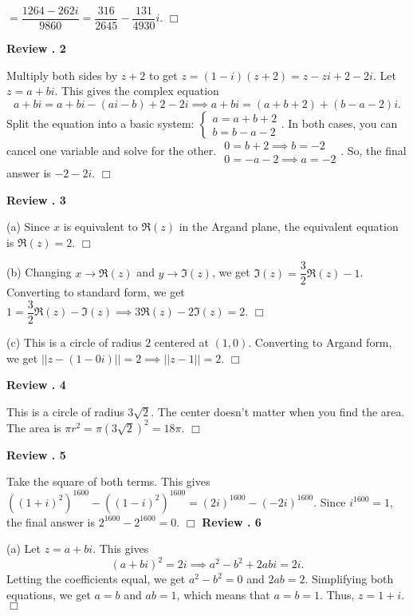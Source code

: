 \documentclass[lang=en,11pt]{elegantbook}
\begin{document}
\hspace{5mm} $\displaystyle =\dfrac{1264-262i}{9860}=\boxed{\dfrac{316}{2645}-\dfrac{131}{4930}i}.$ $\Box$\vspace{3mm}

\noindent \textbf{Review . 2}

Multiply both sides by $z+2$ to get $z=(1-i)(z+2)=z-zi+2-2i$.  Let $z=a+bi$.  This gives the complex equation $$a+bi=a+bi-(ai-b)+2-2i \implies a+bi=(a+b+2)+(b-a-2)i.$$  Split the equation into a basic system: $\begin{cases} a=a+b+2 \\ b=b-a-2 \end{cases}$.  In both cases, you can cancel one variable and solve for the other.  $\begin{matrix} 0=b+2 \implies b=-2 \\ 0=-a-2 \implies a=-2 \end{matrix}$.  So, the final answer is $\boxed{-2-2i}$. $\Box$\vspace{3mm}

\noindent \textbf{Review . 3}

(a) Since $x$ is equivalent to $\Re(z)$ in the Argand plane, the equivalent equation is $\boxed{\Re(z)=2}$. $\Box$

(b) Changing $x\to\Re(z)$ and $y\to\Im(z)$, we get $\Im(z)=\dfrac{3}{2}\Re(z)-1$.  Converting to standard form, we get $1=\dfrac{3}{2}\Re(z)-\Im(z) \implies \boxed{3\Re(z)-2\Im(z)=2}.$ $\Box$

(c) This is a circle of radius $2$ centered at $(1,0)$.  Converting to Argand form, we get $||z-(1-0i)||=2 \implies \boxed{||z-1||=2}.$ $\Box$\vspace{3mm}

\noindent \textbf{Review . 4}

This is a circle of radius $3\sqrt{2}$.  The center doesn't matter when you find the area.  The area is $\pi r^2=\pi \left(3\sqrt{2}\right)^2=\boxed{18\pi}.$ $\Box$\vspace{3mm}

\noindent \textbf{Review . 5}

Take the square of both terms.  This gives $\left((1+i)^2\right)^{1600}-\left((1-i)^2\right)^{1600}=(2i)^{1600}-(-2i)^{1600}$.  Since $i^{1600}=1$, the final answer is $2^{1600}-2^{1600}=\boxed{0}.$ $\Box$\vspace{3mm}
\newpage
\noindent \textbf{Review . 6}

(a) Let $z=a+bi$.  This gives $$(a+bi)^2=2i \implies a^2-b^2+2abi=2i.$$  Letting the coefficients equal, we get $a^2-b^2=0$ and $2ab=2$.  Simplifying both equations, we get $a=b$ and $ab=1$, which means that $a=b=1$.  Thus, $\boxed{z=1+i}.$ $\Box$\vspace{3mm}
\end{document}
